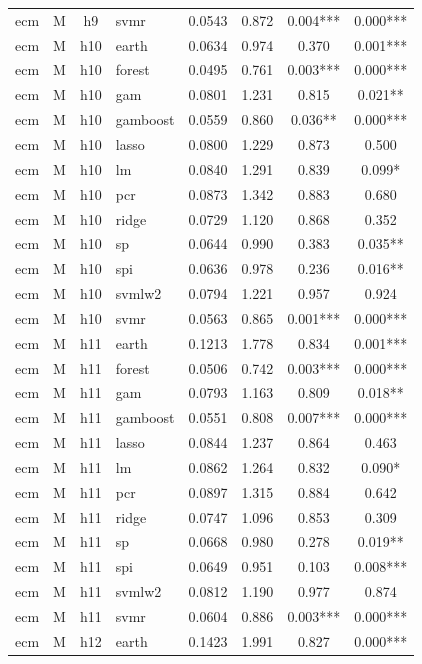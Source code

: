 \begin{ThreePartTable}
\begin{longtable}[t]{llclcccc}
ecm & M & h9 & svmr & 0.0543 & 0.872 & 0.004*** & 0.000***\\
\addlinespace
ecm & M & h10 & earth & 0.0634 & 0.974 & 0.370 & 0.001***\\
ecm & M & h10 & forest & 0.0495 & 0.761 & 0.003*** & 0.000***\\
ecm & M & h10 & gam & 0.0801 & 1.231 & 0.815 & 0.021**\\
ecm & M & h10 & gamboost & 0.0559 & 0.860 & 0.036** & 0.000***\\
ecm & M & h10 & lasso & 0.0800 & 1.229 & 0.873 & 0.500\\
ecm & M & h10 & lm & 0.0840 & 1.291 & 0.839 & 0.099*\\
ecm & M & h10 & pcr & 0.0873 & 1.342 & 0.883 & 0.680\\
ecm & M & h10 & ridge & 0.0729 & 1.120 & 0.868 & 0.352\\
ecm & M & h10 & sp & 0.0644 & 0.990 & 0.383 & 0.035**\\
ecm & M & h10 & spi & 0.0636 & 0.978 & 0.236 & 0.016**\\
ecm & M & h10 & svmlw2 & 0.0794 & 1.221 & 0.957 & 0.924\\
ecm & M & h10 & svmr & 0.0563 & 0.865 & 0.001*** & 0.000***\\
\addlinespace
ecm & M & h11 & earth & 0.1213 & 1.778 & 0.834 & 0.001***\\
ecm & M & h11 & forest & 0.0506 & 0.742 & 0.003*** & 0.000***\\
ecm & M & h11 & gam & 0.0793 & 1.163 & 0.809 & 0.018**\\
ecm & M & h11 & gamboost & 0.0551 & 0.808 & 0.007*** & 0.000***\\
ecm & M & h11 & lasso & 0.0844 & 1.237 & 0.864 & 0.463\\
ecm & M & h11 & lm & 0.0862 & 1.264 & 0.832 & 0.090*\\
ecm & M & h11 & pcr & 0.0897 & 1.315 & 0.884 & 0.642\\
ecm & M & h11 & ridge & 0.0747 & 1.096 & 0.853 & 0.309\\
ecm & M & h11 & sp & 0.0668 & 0.980 & 0.278 & 0.019**\\
ecm & M & h11 & spi & 0.0649 & 0.951 & 0.103 & 0.008***\\
ecm & M & h11 & svmlw2 & 0.0812 & 1.190 & 0.977 & 0.874\\
ecm & M & h11 & svmr & 0.0604 & 0.886 & 0.003*** & 0.000***\\
\addlinespace
ecm & M & h12 & earth & 0.1423 & 1.991 & 0.827 & 0.000***\\

\end{longtable}
\end{ThreePartTable}

